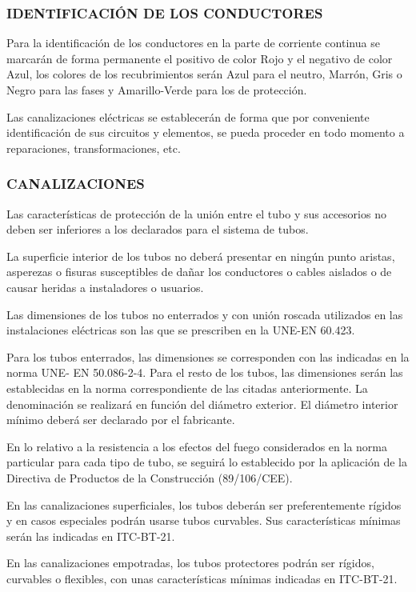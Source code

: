 \documentclass{article}
\begin{document}
\subsubsection{IDENTIFICACIÓN DE LOS CONDUCTORES}
Para la identificación de los conductores en la parte de corriente continua se marcarán de
forma permanente el positivo de color Rojo y el negativo de color Azul, los colores de los
recubrimientos serán Azul para el neutro, Marrón, Gris o Negro para las fases y Amarillo-Verde
para los de protección.

Las canalizaciones eléctricas se establecerán de forma que por conveniente identificación de
sus circuitos y elementos, se pueda proceder en todo momento a reparaciones,
transformaciones, etc.



\subsubsection{CANALIZACIONES}
Las características de protección de la unión entre el tubo y sus accesorios no deben ser
inferiores a los declarados para el sistema de tubos.

La superficie interior de los tubos no deberá presentar en ningún punto aristas, asperezas o
fisuras susceptibles de dañar los conductores o cables aislados o de causar heridas a
instaladores o usuarios.

Las dimensiones de los tubos no enterrados y con unión roscada utilizados en las instalaciones
eléctricas son las que se prescriben en la UNE-EN 60.423.

Para los tubos enterrados, las dimensiones se corresponden con las indicadas en la norma UNE-
EN 50.086-2-4. Para el resto de los tubos, las dimensiones serán las establecidas en la norma
correspondiente de las citadas anteriormente. La denominación se realizará en función del
diámetro exterior. El diámetro interior mínimo deberá ser declarado por el fabricante.


En lo relativo a la resistencia a los efectos del fuego considerados en la norma particular para
cada tipo de tubo, se seguirá lo establecido por la aplicación de la Directiva de Productos de la
Construcción (89/106/CEE).

En las canalizaciones superficiales, los tubos deberán ser preferentemente rígidos y en casos
especiales podrán usarse tubos curvables. Sus características mínimas serán las indicadas en
ITC-BT-21.

En las canalizaciones empotradas, los tubos protectores podrán ser rígidos, curvables o
flexibles, con unas características mínimas indicadas en ITC-BT-21.
\end{document}

